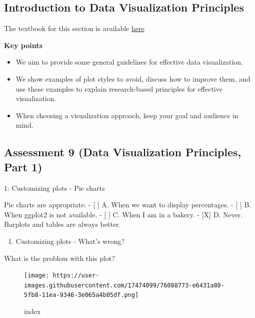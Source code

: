 \documentclass[
]{article}
\providecommand{\tightlist}{%
  \setlength{\itemsep}{0pt}\setlength{\parskip}{0pt}}
\begin{document}
\hypertarget{introduction-to-data-visualization-principles}{%
\subsection{Introduction to Data Visualization
Principles}\label{introduction-to-data-visualization-principles}}

The textbook for this section is available
\href{https://rafalab.github.io/dsbook/data-visualization-principles.html}{here}

\textbf{Key points}

\begin{itemize}
\tightlist
\item
  We aim to provide some general guidelines for effective data
  visualization.
\item
  We show examples of plot styles to avoid, discuss how to improve them,
  and use these examples to explain research-based principles for
  effective visualization.
\item
  When choosing a visualization approach, keep your goal and audience in
  mind.
\end{itemize}

\hypertarget{assessment-9-data-visualization-principles-part-1}{%
\subsection{Assessment 9 (Data Visualization Principles, Part
1)}\label{assessment-9-data-visualization-principles-part-1}}

1: Customizing plots - Pie charts

Pie charts are appropriate: - {[} {]} A. When we want to display
percentages. - {[} {]} B. When ggplot2 is not available. - {[} {]} C.
When I am in a bakery. - {[}X{]} D. Never. Barplots and tables are
always better.

\begin{enumerate}
\def\labelenumi{\arabic{enumi}.}
\setcounter{enumi}{1}
\tightlist
\item
  Customizing plots - What's wrong?
\end{enumerate}

What is the problem with this plot?

\begin{figure}
\centering
\texttt{[image: https://user-images.githubusercontent.com/17474099/76088773-e6431a80-5fb8-11ea-9346-3e065a4b05df.png]}
\caption{index}
\end{figure}
\end{document}
